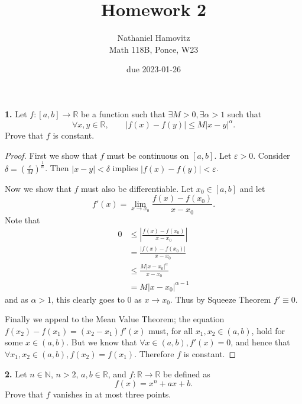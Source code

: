 \documentclass{article}
\newcommand{\R}{\mathbb{R}}
\newcommand{\N}{\mathbb{N}}
\newcommand{\abs}[1]{\left| #1 \right|}
\newcommand{\paren}[1]{\left( #1 \right)}
\newcommand{\problem}[1]{\noindent \textbf{#1}}
\begin{document}


\title{Homework 2} %
\author{Nathaniel Hamovitz\\Math 118B, Ponce, W23}
\date{due 2023-01-26}

\maketitle

\problem{1. } %
Let $f: [a, b] \to \R$ be a function such that $\exists M > 0, \exists \alpha > 1$ such that
$$\forall x, y \in \R, \qquad \abs{f(x) - f(y)} \le M\abs{x - y}^{\alpha}.$$
Prove that $f$ is constant.

\begin{proof}
    First we show that $f$ must be continuous on $[a, b]$. Let $\varepsilon > 0$. Consider $\delta = \paren{\frac{\varepsilon}{M}}^{\frac{1}{\alpha}}$. Then $\abs{x - y} < \delta$ implies $\abs{f(x) - f(y)} < \varepsilon$.

    Now we show that $f$ must also be differentiable. Let $x_0 \in [a, b]$ and let
    $$f'(x) = \lim_{x \to x_0} \frac{f(x) - f(x_0)}{x - x_0}.$$
    Note that
    \begin{align*}
        0 &\le \abs{\frac{f(x) - f(x_0)}{x - x_0}} \\
        &= \frac{\abs{f(x) - f(x_0)}}{x - x_0} \\
        &\le \frac{M\abs{x - x_0}^{\alpha}}{x - x_0} \\
        &= M\abs{x - x_0}^{\alpha - 1}
    \end{align*}
    and as $\alpha > 1$, this clearly goes to $0$ as $x \to x_0$. Thus by Squeeze Theorem $f' \equiv 0$.

    Finally we appeal to the Mean Value Theorem; the equation $f(x_2) - f(x_1) = (x_2 - x_1)f'(x)$ must, for all $x_1, x_2 \in (a, b)$, hold for some $x \in (a, b)$. But we know that $\forall x \in (a, b), f'(x) = 0$, and hence that $\forall x_1, x_2 \in (a, b), f(x_2) = f(x_1)$. Therefore $f$ is constant.    
\end{proof}


\problem{2. }
Let $n \in \N$, $n > 2$, $a, b \in \R$, and $f: \R \to \R$ be defined as
$$f(x) = x^n + ax + b.$$
Prove that $f$ vanishes in at most three points.
\end{document}

